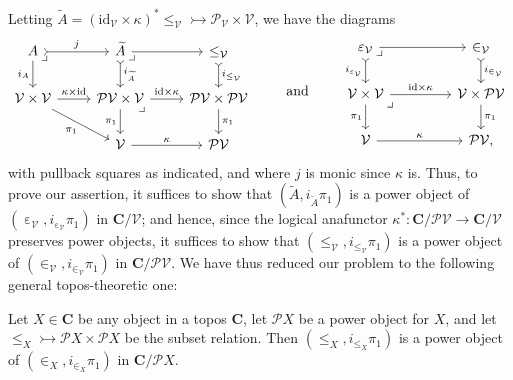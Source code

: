 \documentclass{amsart}
\newcommand\AND{\text{ and }}
\newcommand\bC{\mathbf{C}}
\newcommand\cV{\mathcal{V}}
\newcommand\ein{\mathrel{\varepsilon}}
\newcommand\id{\mathrm{id}}
\newcommand\pb[1][rd]{\ar[#1, phantom, "\lrcorner", pos=0]}
\newcommand\pow{\mathcal{P}}
\newcommand\tto{\rightarrowtail}
\newcommand\unein{{\ein}}
\newcommand\unin{{\in}}
\newcommand\wt[1]{\widetilde{#1}}
\theoremstyle{definition}
\theoremstyle{remark}
\theoremstyle{plainwithref}
\begin{document}
Letting \( \wt A = (\id_{\cV} \times \kappa)^* {\le}_{\cV} \tto \pow_\cV \times \cV \), we have the diagrams
\[
  \begin{tikzcd}
    A \pb \ar[r, "j", >->] \ar[d, "i_A"'] &
    \wt A \pb \ar[d, >->, "i_{\wt A}"] \ar[r] & \le_{\cV} \ar[d, "i_{\le_{\cV}}", >->] \\
    \cV \times \cV \ar[r, "\kappa \times \id"] \ar[rd, "\pi_1"'] & \pow \cV \times \cV \pb \ar[r, "\id \times \kappa"] \ar[d, "\pi_1"'] & \pow \cV \times \pow \cV \ar[d, "\pi_1"] \\
    & \cV \ar[r, "\kappa"] & \pow \cV
  \end{tikzcd}
  \qquad \AND \qquad
  \begin{tikzcd}
    \unein_\cV \pb \ar[r, ""] \ar[d, "i_{\ein_\cV}"', >->] &[20pt] \unin_\cV \ar[d, "i_{\unin_\cV}", >->] \\
    \cV \times \cV \pb \ar[r, "\id \times \kappa"] \ar[d, "\pi_1"'] & \cV \times \pow \cV \ar[d, "\pi_1"] \\
    \cV \ar[r, "\kappa"] &\pow \cV,
  \end{tikzcd}
\]
with pullback squares as indicated, and where \( j \) is monic since \( \kappa \) is.
Thus, to prove our assertion, it suffices to show that \( (\wt A, i_{\wt A} \pi_1) \) is a power object of \( (\unein_\cV, i_{\ein_\cV} \pi_1) \) in \( \bC / \cV \); and hence, since the logical anafunctor \( \kappa^* \colon \bC / \pow \cV \to \bC / \cV \) preserves power objects, it suffices to show that \( (\le_{\cV}, i_{\le_{\cV}} \pi_1) \) is a power object of \( (\unin_\cV, i_{\unin_\cV} \pi_1) \) in \( \bC / \pow \cV \).
We have thus reduced our problem to the following general topos-theoretic one:

\begin{claim}
  Let \( X \in \bC \) be any object in a topos \( \bC \), let \( \pow X \) be a power object for \( X \), and let \( {\le_X} \tto \pow X \times \pow X \) be the subset relation.
  Then \( (\le_X, i_{\le_X} \pi_1) \) is a power object of \( (\in_{X}, i_{\in_{X}} \pi_1) \) in \( \bC / \pow X \).
\end{claim}
\end{document}
